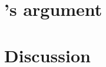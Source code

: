 \documentclass[11pt, xcolor=dvipsnames]{article}
\begin{document}
\section*{\citeauthor[][]{Jacobs2014}'s \citeyear{Jacobs2014} argument}


\section*{Discussion}


\newpage
\newpage
\thispagestyle{empty}
\begingroup
{}
\printbibliography
\endgroup
\end{document}
